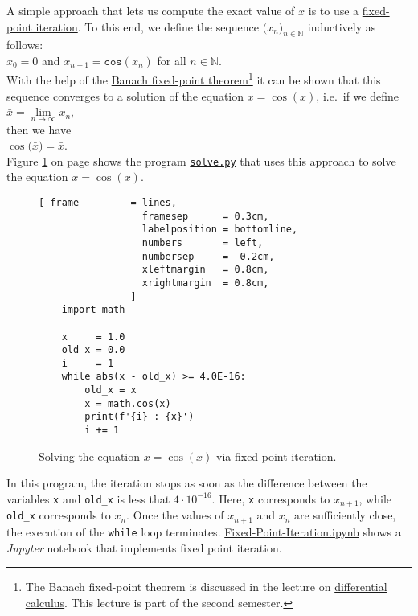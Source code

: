 A simple approach that lets us compute the exact value of $x$ is to use a
\href{https://en.wikipedia.org/wiki/Fixed-point_iteration}{fixed-point iteration}.  To this end, we
define the sequence $\bigl(x_n\bigr)_{n\in\mathbb{N}}$ inductively as follows:
\\[0.2cm]
\hspace*{1.3cm} 
$x_0 = 0$ \quad and \quad $x_{n+1} = \mathtt{cos}(x_n)$ \quad for all $n \in \mathbb{N}$. 
\\[0.2cm]
With the help of the 
\href{https://en.wikipedia.org/wiki/Banach_fixed-point_theorem}{Banach fixed-point theorem}\footnote{
  The Banach fixed-point theorem is discussed in the lecture on
  \href{https://en.wikipedia.org/wiki/Differential_calculus}{differential calculus}.  This lecture is part of the
  second semester.
}
it can be shown that this sequence converges to a solution of the equation $x = \cos(x)$, i.e.~if we define
\\[0.2cm]
\hspace*{1.3cm}
$\bar{x} = \lim\limits_{n\rightarrow\infty} x_n$,
\\[0.2cm]
then we have
\\[0.2cm]
\hspace*{1.3cm}
$\cos\bigl(\bar{x}\bigr) = \bar{x}$.
\\[0.2cm]
Figure \ref{fig:solve.py} on page \pageref{fig:solve.py} shows the program
\href{https://github.com/karlstroetmann/Logik/blob/master/Python/solve.py}{\texttt{solve.py}}
that uses this approach to solve the equation $x = \cos(x)$.


\begin{figure}[!ht]
  \centering
\begin{Verbatim}[ frame         = lines, 
                  framesep      = 0.3cm, 
                  labelposition = bottomline,
                  numbers       = left,
                  numbersep     = -0.2cm,
                  xleftmargin   = 0.8cm,
                  xrightmargin  = 0.8cm,
                ]
    import math
    
    x     = 1.0
    old_x = 0.0
    i     = 1
    while abs(x - old_x) >= 4.0E-16:
        old_x = x
        x = math.cos(x)
        print(f'{i} : {x}')
        i += 1
\end{Verbatim} 
\vspace*{-0.3cm}
\caption{Solving the equation $x = \cos(x)$ via fixed-point iteration.}  \label{fig:solve.py}
\end{figure} %

In this program, the iteration stops as soon as the difference between the variables \texttt{x} and 
\texttt{old\_x} is less that $4 \cdot 10^{-16}$.  Here, \texttt{x} corresponds to $x_{n+1}$, while \texttt{old\_x}
corresponds to $x_n$.  Once the values of $x_{n+1}$ and $x_n$ are sufficiently close, the execution of the \texttt{while} loop
terminates.
\href{https://github.com/karlstroetmann/Logik/blob/master/Python/Fixed-Point-Iteration.ipynb}{Fixed-Point-Iteration.ipynb}
shows a \textsl{Jupyter} notebook that implements fixed point iteration.


